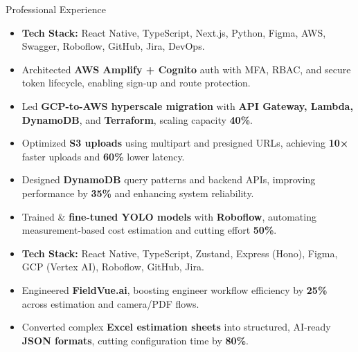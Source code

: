 \documentclass{resume}
\begin{document}
\begin{experienceSection}{Professional Experience}


    \experienceItem[
        company={Maverick Secure LLC},
        position={Software Engineering Intern},
        duration={December 2025 – Present}
    ]
\begin{itemize}\small
    \itemsep -5pt {}
    \item \textbf{Tech Stack:} React Native, TypeScript, Next.js, Python, Figma, AWS, Swagger, Roboflow, GitHub, Jira, DevOps.
    
    \item Architected \textbf{AWS Amplify + Cognito} auth with MFA, RBAC, and secure token lifecycle, enabling sign-up and route protection.
    
    \item Led \textbf{GCP-to-AWS hyperscale migration} with \textbf{API Gateway, Lambda, DynamoDB}, and \textbf{Terraform}, scaling capacity \textbf{40\%}.
    
    \item Optimized \textbf{S3 uploads} using multipart and presigned URLs, achieving \textbf{10×} faster uploads and \textbf{60\%} lower latency.
    
    \item Designed \textbf{DynamoDB} query patterns and backend APIs, improving performance by \textbf{35\%} and enhancing system reliability.
    
    \item Trained \& \textbf{fine-tuned YOLO models} with \textbf{Roboflow}, automating measurement-based cost estimation and cutting effort \textbf{50\%}.

    
\end{itemize}

    \experienceItem[
        company={Maverick Secure LLC},
        position={Mobile Development Intern},
        duration={July 2025 – November 2025}
    ]
\begin{itemize}\small
    \itemsep -5pt {}
    \item \textbf{Tech Stack:} React Native, TypeScript, Zustand, Express (Hono), Figma, GCP (Vertex AI), Roboflow, GitHub, Jira.

    \item Engineered \textbf{FieldVue.ai}, boosting engineer workflow efficiency by \textbf{25\%} across estimation and camera/PDF flows.


    \item Converted complex \textbf{Excel estimation sheets} into structured, AI-ready \textbf{JSON formats}, cutting configuration time by \textbf{80\%}.


\end{itemize}
\end{experienceSection}
\end{document}
